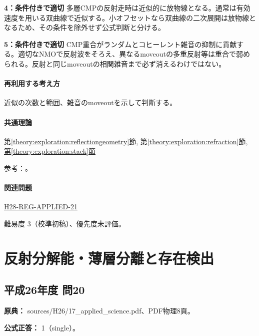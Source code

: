 \noindent\textbf{4：条件付きで適切} 多層CMPの反射走時は近似的に放物線となる。通常は有効速度を用いる双曲線で近似する。小オフセットなら双曲線の二次展開は放物線となるため、その条件を除外せず公式判断と分ける。\par

\noindent\textbf{5：条件付きで適切} CMP重合がランダムとコヒーレント雑音の抑制に貢献する。適切なNMOで反射波をそろえ、異なるmoveoutの多重反射等は重合で弱められる。反射と同じmoveoutの相関雑音まで必ず消えるわけではない。\par

\paragraph{再利用する考え方} 近似の次数と範囲、雑音のmoveoutを示して判断する。

\paragraph{共通理論} \hyperref[theory:exploration:reflectiongeometry]{第\ref*{theory:exploration:reflectiongeometry}節}, \hyperref[theory:exploration:refraction]{第\ref*{theory:exploration:refraction}節}, \hyperref[theory:exploration:stack]{第\ref*{theory:exploration:stack}節}

\par 参考：\cite{epa_seismic_reflection,jica_refraction2015,usgs_processing2000}。

\paragraph{関連問題} \hyperref[q:h28-reg-applied-21]{H28-REG-APPLIED-21}

\par 難易度 3（校準初稿）、優先度未評価。

\section{反射分解能・薄層分離と存在検出}

\subsection{平成26年度 問20}
\label{q:h26-reg-applied-20}

\noindent\textbf{原典：} sources/H26/17\_applied\_science.pdf、PDF物理8頁。

\textbf{公式正答：} 1（single）。

